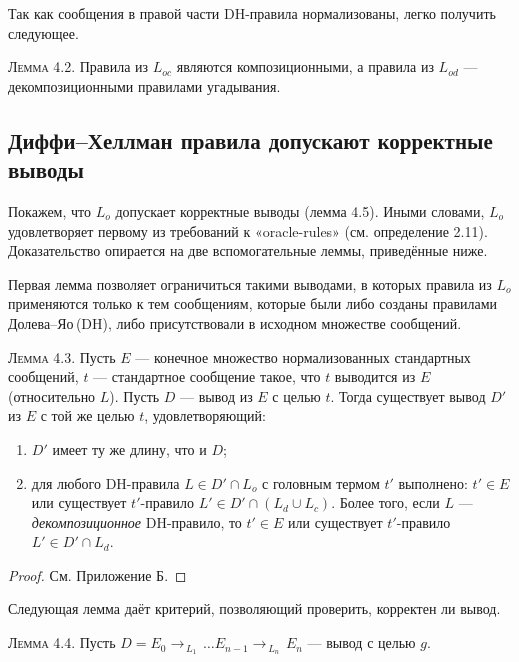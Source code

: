 \medskip
Так как сообщения в правой части DH-правила нормализованы,
легко получить следующее.

\textsc{Лемма 4.2.}
Правила из \(L_{oc}\) являются композиционными,
а правила из \(L_{od}\) — декомпозиционными правилами угадывания.

\subsection{Диффи–Хеллман правила допускают корректные выводы}

Покажем, что \(L_o\) допускает корректные выводы (лемма 4.5).  
Иными словами, \(L_o\) удовлетворяет первому из требований к «oracle-rules»
(см. определение 2.11).  
Доказательство опирается на две вспомогательные леммы, приведённые ниже.

Первая лемма позволяет ограничиться такими выводами, в которых
правила из \(L_o\) применяются только к тем сообщениям,  
которые были либо созданы правилами Долева–Яо\,(DH),  
либо присутствовали в исходном множестве сообщений.

\textsc{Лемма 4.3.}
Пусть \(E\) — конечное множество нормализованных стандартных сообщений,
\(t\) — стандартное сообщение такое, что \(t\) выводится из \(E\) (относительно \(L\)).
Пусть \(D\) — вывод из \(E\) с целью \(t\).
Тогда существует вывод \(D'\) из \(E\) с той же целью \(t\), удовлетворяющий:

\begin{enumerate}
  \item \(D'\) имеет ту же длину, что и \(D\);
  \item для любого DH-правила \(L\in D'\cap L_{o}\) с головным термом \(t'\)
        выполнено: \(t'\in E\) \;или\;  
        существует \(t'\)-правило \(L'\in D'\cap(L_{d}\cup L_{c})\).
        Более того, если \(L\) — \emph{декомпозиционное} DH-правило,
        то \(t'\in E\) \;или\;
        существует \(t'\)-правило \(L'\in D'\cap L_{d}\).
\end{enumerate}

\begin{proof} См. Приложение Б.\end{proof}

Следующая лемма даёт критерий, позволяющий проверить,
корректен ли вывод.

\textsc{Лемма 4.4.}
Пусть
\(D = E_0 \rightarrow_{\,L_1\,} \dots
      E_{n-1} \rightarrow_{\,L_n\,} E_n\)
— вывод с целью \(g\).

